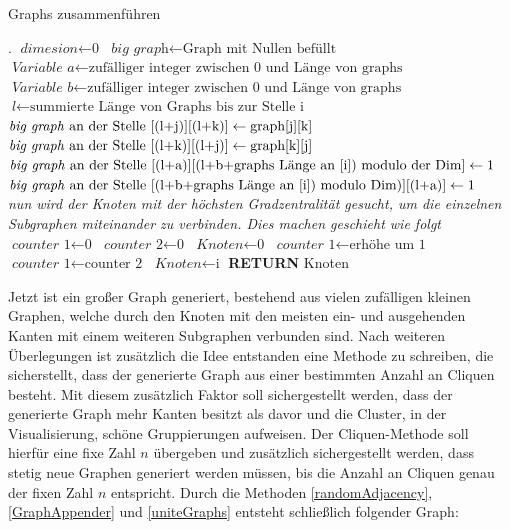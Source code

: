 \begin{algorithm}
\caption{Graphs zusammenführen}\label{uniteGraphs}
\begin{algorithmic}[1]
\State {}.
\EndIf
\State $\textit{dimesion} \gets \text{0}$
\State $\textit{big graph} \gets \text{Graph mit Nullen befüllt}$
\State $\textit{Variable a} \gets \text{zufälliger integer zwischen 0 und Länge von graphs}$
\State $\textit{Variable b} \gets \text{zufälliger integer zwischen 0 und Länge von graphs}$
\State $\textit{l} \gets \text{summierte Länge von Graphs bis zur Stelle i}$
\State $\text{\textit{big graph} an der Stelle [(l+j)][(l+k)]} \gets \text{graph[j][k]}$
\State $\text{\textit{big graph} an der Stelle [(l+k)][(l+j)]} \gets \text{graph[k][j]}$
\State $\text{\textit{big graph} an der Stelle [(l+a)][(l+b+graphs Länge an [i]) modulo der Dim]} \gets \text{1}$
\State $\text{\textit{big graph} an der Stelle [(l+b+graphs Länge an [i]) modulo Dim)][(l+a)]} \gets \text{1}$
\EndFor
\EndFor
\\
\textit{nun wird der Knoten mit der höchsten Gradzentralität gesucht, um die einzelnen}
\textit{Subgraphen miteinander zu verbinden. Dies machen geschieht wie folgt}\\
\State $\textit{counter 1} \gets \text{0}$
\State $\textit{counter 2} \gets \text{0}$
\State $\textit{Knoten} \gets \text{0}$
\State $\textit{counter 1} \gets \text{erhöhe um 1}$
\State $\textit{counter 1} \gets \text{counter 2}$
\State $\textit{Knoten} \gets \text{i}$
\EndIf
\EndIf
\EndFor
\textbf{RETURN} Knoten 
\EndProcedure
\end{algorithmic}
\end{algorithm}

Jetzt ist ein großer Graph generiert, bestehend aus vielen zufälligen kleinen Graphen, welche durch den Knoten mit den meisten ein- und ausgehenden Kanten mit einem weiteren Subgraphen verbunden sind.
Nach weiteren Überlegungen ist zusätzlich die Idee entstanden eine Methode zu schreiben, die sicherstellt, dass der generierte Graph aus einer bestimmten Anzahl an Cliquen besteht. Mit diesem zusätzlich Faktor soll sichergestellt werden, dass der generierte Graph mehr Kanten besitzt als davor und die Cluster, in der Visualisierung, schöne Gruppierungen aufweisen. Der Cliquen-Methode soll hierfür eine fixe Zahl $n$ übergeben und zusätzlich sichergestellt werden, dass stetig neue Graphen generiert werden müssen, bis die Anzahl an Cliquen genau der fixen Zahl $n$ entspricht.
Durch die Methoden \ref{randomAdjacency}, \ref{GraphAppender} und \ref{uniteGraphs} entsteht schließlich folgender Graph:

